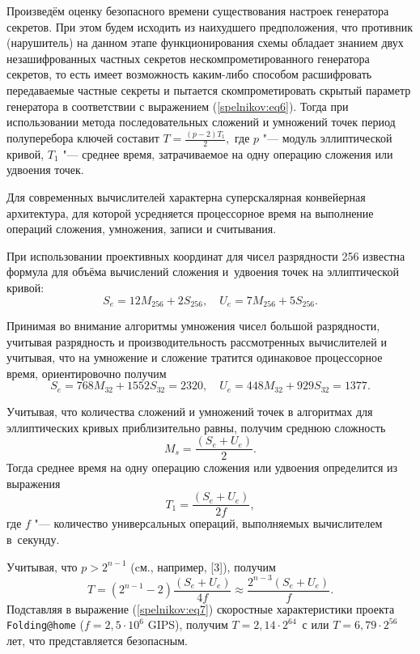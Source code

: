 Произведём оценку безопасного времени существования настроек генератора
секретов. При этом будем исходить из наихудшего предположения, что противник
(нарушитель) на данном этапе функционирования схемы обладает знанием двух
незашифрованных частных секретов нескомпрометированного генератора секретов,
то есть имеет возможность каким-либо способом расшифровать передаваемые
частные секреты и пытается скомпрометировать скрытый параметр генератора в
соответствии с выражением (\ref{spelnikov:eq6}).
Тогда при использовании метода последовательных сложений и умножений точек
период полуперебора ключей составит
$ T=\frac{(p-2)T_1 }{2},
$
где $p$ "--- модуль эллиптической кривой,
$T_1 $ "---  среднее время, затрачиваемое на одну операцию сложения или удвоения
точек.

Для современных вычислителей характерна суперскалярная конвейерная
архитектура, для которой усредняется процессорное время на выполнение
операций сложения, умножения, записи и считывания.

При использовании проективных координат для чисел разрядности 256 известна
формула для объёма вычислений сложения и~удвоения точек на эллиптической
кривой:
\[
S_e =12M_{256} +2S_{256} ,
\quad
U_e =7M_{256} +5S_{256} .
\]

Принимая во внимание алгоритмы умножения чисел большой разрядности, учитывая
разрядность и производительность рассмотренных вычислителей и учитывая, что
на умножение и сложение тратится одинаковое процессорное время,
ориентировочно получим
\[
S_e =768M_{32} +1552S_{32} =2320, \quad
U_e =448M_{32} +929S_{32} =1377.
\]

Учитывая, что количества сложений и умножений точек в алгоритмах
для эллиптических кривых приблизительно равны, получим среднюю сложность
\[
M_s =\frac{(S_e +U_e )}{2}.
\]
Тогда среднее время на одну операцию сложения или удвоения определится из
выражения
\[
T_1 =\frac{(S_e +U_e )}{2f},
\]
где $f$ "--- количество универсальных операций, выполняемых вычислителем
в~секунду.

Учитывая, что
$ p>2^{n-1}$ (cм., например, [3]),
получим
\begin{equation}
\label{spelnikov:eq7}
T=(2^{n-1}-2)\frac{(S_e +U_e )}{4f}\approx \frac{2^{n-3}(S_e +U_e )}{f}.
\end{equation}
Подставляя в выражение (\ref{spelnikov:eq7}) скоростные характеристики проекта \texttt{\small Folding@home}
($f = 2,5\cdot 10^{6}$ GIPS), получим $T=2,14\cdot 2^{64}$~с или $T=6,79\cdot 2^{56}$ лет, что представляется безопасным.


